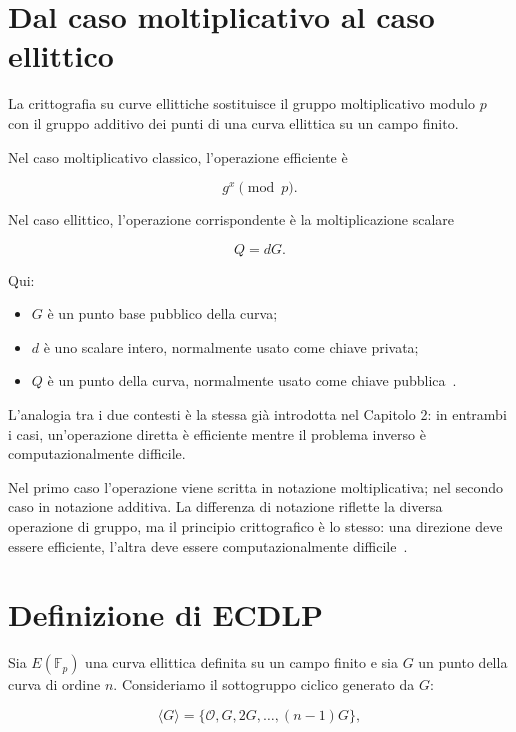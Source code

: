 \documentclass[12pt,a4paper,oneside]{report}
\begin{document}
\section{Dal caso moltiplicativo al caso ellittico}

La crittografia su curve ellittiche sostituisce il gruppo moltiplicativo modulo \(p\) con il gruppo additivo dei punti di una curva ellittica su un campo finito.

Nel caso moltiplicativo classico, l'operazione efficiente è

\[
g^x \pmod p.
\]

Nel caso ellittico, l'operazione corrispondente è la moltiplicazione scalare

\[
Q = dG.
\]

Qui:

\begin{itemize}
    \item \(G\) è un punto base pubblico della curva;
    \item \(d\) è uno scalare intero, normalmente usato come chiave privata;
    \item \(Q\) è un punto della curva, normalmente usato come chiave pubblica~\cite{margara_ec,sec1}.
\end{itemize}

L'analogia tra i due contesti è la stessa già introdotta nel Capitolo 2: in entrambi i casi, un'operazione diretta è efficiente mentre il problema inverso è computazionalmente difficile.

Nel primo caso l'operazione viene scritta in notazione moltiplicativa; nel secondo caso in notazione additiva. La differenza di notazione riflette la diversa operazione di gruppo, ma il principio crittografico è lo stesso: una direzione deve essere efficiente, l'altra deve essere computazionalmente difficile~\cite{margara_complessita,margara_ec}.

\section{Definizione di ECDLP}

Sia \(E(\mathbb{F}_p)\) una curva ellittica definita su un campo finito e sia \(G\) un punto della curva di ordine \(n\). Consideriamo il sottogruppo ciclico generato da \(G\):

\begin{equation}
    \langle G \rangle = \{\mathcal{O},G,2G,\ldots,(n-1)G\},
\end{equation}
\end{document}
